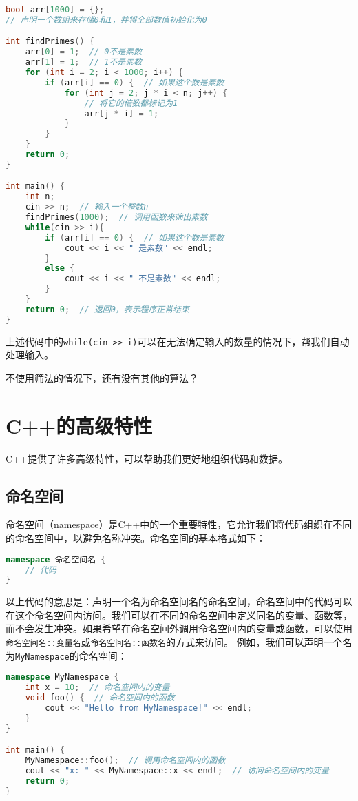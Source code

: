 \documentclass[../main.tex]{subfiles}
\begin{document}
\begin{answer}
\begin{lstlisting}[language=C++]
bool arr[1000] = {};
// 声明一个数组来存储0和1，并将全部数值初始化为0

int findPrimes() {
    arr[0] = 1;  // 0不是素数
    arr[1] = 1;  // 1不是素数
    for (int i = 2; i < 1000; i++) {
        if (arr[i] == 0) {  // 如果这个数是素数
            for (int j = 2; j * i < n; j++) {
                // 将它的倍数都标记为1
                arr[j * i] = 1;
            }
        }
    }
    return 0;
}

int main() {
    int n;
    cin >> n;  // 输入一个整数n
    findPrimes(1000);  // 调用函数来筛出素数
    while(cin >> i){
        if (arr[i] == 0) {  // 如果这个数是素数
            cout << i << " 是素数" << endl;
        }
        else {
            cout << i << " 不是素数" << endl;
        }
    }
    return 0;  // 返回0，表示程序正常结束
}
\end{lstlisting}
  上述代码中的\texttt{while(cin >> i)}可以在无法确定输入的数量的情况下，帮我们自动处理输入。
\end{answer}

\begin{exercise}
  不使用筛法的情况下，还有没有其他的算法？
\end{exercise}

\section{C++的高级特性}
C++提供了许多高级特性，可以帮助我们更好地组织代码和数据。

\subsection{命名空间}

命名空间（namespace）是C++中的一个重要特性，它允许我们将代码组织在不同的命名空间中，以避免名称冲突。命名空间的基本格式如下：
\begin{lstlisting}[language=C++]
namespace 命名空间名 {
    // 代码
}
\end{lstlisting}
以上代码的意思是：声明一个名为命名空间名的命名空间，命名空间中的代码可以在这个命名空间内访问。我们可以在不同的命名空间中定义同名的变量、函数等，而不会发生冲突。如果希望在命名空间外调用命名空间内的变量或函数，可以使用\texttt{命名空间名::变量名}或\texttt{命名空间名::函数名}的方式来访问。
例如，我们可以声明一个名为\texttt{MyNamespace}的命名空间：
\begin{lstlisting}[language=C++]
namespace MyNamespace {
    int x = 10;  // 命名空间内的变量
    void foo() {  // 命名空间内的函数
        cout << "Hello from MyNamespace!" << endl;
    }
}

int main() {
    MyNamespace::foo();  // 调用命名空间内的函数
    cout << "x: " << MyNamespace::x << endl;  // 访问命名空间内的变量
    return 0;
}
\end{lstlisting}
\end{document}
